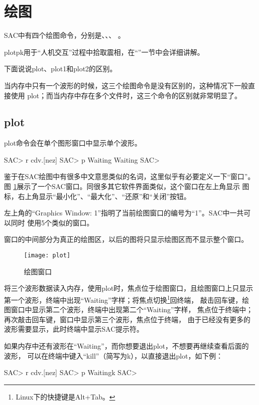 \section{绘图}

SAC中有四个绘图命令，分别是、、、
。

plotpk用于``人机交互''过程中拾取震相，在``''一节中会详细讲解。

下面说说plot、plot1和plot2的区别。

当内存中只有一个波形的时候，这三个绘图命令是没有区别的，这种情况下一般直接使用
plot；而当内存中存在多个文件时，这三个命令的区别就非常明显了。

\subsection{plot}
plot命令会在单个图形窗口中显示单个波形。
\begin{SACCode}
SAC> r cdv.[nez]
SAC> p
Waiting
Waiting
SAC>
\end{SACCode}

鉴于在SAC绘图中有很多中文意思类似的名词，这里似乎有必要定义一下``窗口''。图
\ref{fig:plot}展示了一个SAC窗口。同很多其它软件界面类似，这个窗口在左上角显示
图标，右上角显示``最小化''、``最大化''、``还原''和``关闭''按钮。

左上角的``Graphics Window: 1''指明了当前绘图窗口的编号为``1''。SAC中一共可以同时
使用5个类似的窗口。

窗口的中间部分为真正的绘图区，以后的图将只显示绘图区而不显示整个窗口。

\begin{figure}[H]
\centering
\texttt{[image: plot]}
\caption{绘图窗口}
\label{fig:plot}
\end{figure}

将三个波形数据读入内存，使用plot时，焦点位于绘图窗口，且绘图窗口上只显示
第一个波形，终端中出现``Waiting''字样；将焦点切换\footnote{Linux下的快捷键是Alt+Tab。}回终端，
敲击回车键，绘图窗口中显示第二个波形，终端中出现第二个``Waiting''字样，
焦点位于终端中；再次敲击回车键，窗口中显示第三个波形，焦点位于终端，
由于已经没有更多的波形需要显示，此时终端中显示SAC提示符。

如果内存中还有波形在``Waiting''，而你想要退出plot，不想要再继续查看后面的波形，
可以在终端中键入``kill''（简写为k），以直接退出plot，如下例：
\begin{SACCode}
SAC> r cdv.[nez]
SAC> p
Waitingk
SAC>
\end{SACCode}

